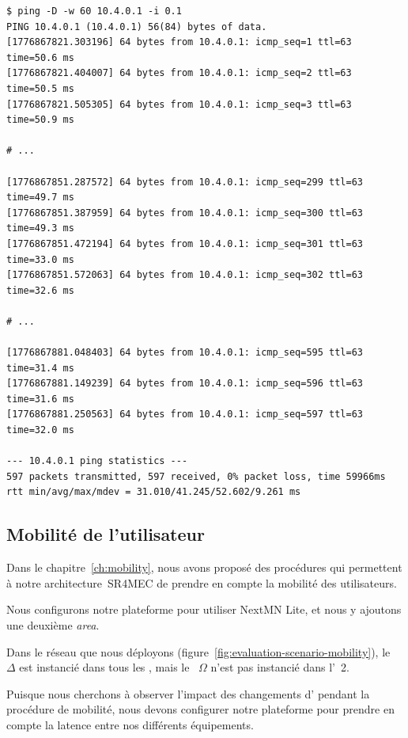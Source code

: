 \documentclass[../main.tex]{subfiles}
\begin{document}
\begin{lstlisting}[style=centercomments,label=ping:rebinding,caption=Ping vers le service~$\Delta$ avec l’architecture~SR4MEC pendant le changement d’\gl{service/instances}{instance}.,captionpos=b,frame=tb]
$ ping -D -w 60 10.4.0.1 -i 0.1 
PING 10.4.0.1 (10.4.0.1) 56(84) bytes of data.
[1776867821.303196] 64 bytes from 10.4.0.1: icmp_seq=1 ttl=63 time=50.6 ms
[1776867821.404007] 64 bytes from 10.4.0.1: icmp_seq=2 ttl=63 time=50.5 ms
[1776867821.505305] 64 bytes from 10.4.0.1: icmp_seq=3 ttl=63 time=50.9 ms

# ...

[1776867851.287572] 64 bytes from 10.4.0.1: icmp_seq=299 ttl=63 time=49.7 ms
[1776867851.387959] 64 bytes from 10.4.0.1: icmp_seq=300 ttl=63 time=49.3 ms
[1776867851.472194] 64 bytes from 10.4.0.1: icmp_seq=301 ttl=63 time=33.0 ms
[1776867851.572063] 64 bytes from 10.4.0.1: icmp_seq=302 ttl=63 time=32.6 ms

# ...

[1776867881.048403] 64 bytes from 10.4.0.1: icmp_seq=595 ttl=63 time=31.4 ms
[1776867881.149239] 64 bytes from 10.4.0.1: icmp_seq=596 ttl=63 time=31.6 ms
[1776867881.250563] 64 bytes from 10.4.0.1: icmp_seq=597 ttl=63 time=32.0 ms

--- 10.4.0.1 ping statistics ---
597 packets transmitted, 597 received, 0% packet loss, time 59966ms
rtt min/avg/max/mdev = 31.010/41.245/52.602/9.261 ms
\end{lstlisting}


\pagebreak
\subsection{Mobilité de l’utilisateur}
\label{sec:evaluation-mobility}

Dans le chapitre~\ref{ch:mobility}, nous avons proposé des procédures qui permettent à notre architecture~SR4MEC de prendre en compte la mobilité des utilisateurs.

Nous configurons notre plateforme pour utiliser NextMN Lite, et nous y ajoutons une deuxième \textit{area}.

Dans le réseau que nous déployons (figure~\ref{fig:evaluation-scenario-mobility}), le ~$\Delta$ est instancié dans tous les , mais le ~$\Omega$ n’est pas instancié dans l’~2.


Puisque nous cherchons à observer l’impact des changements d’ pendant la procédure de mobilité, nous devons configurer notre plateforme pour prendre en compte la latence entre nos différents équipements. 
\end{document}
